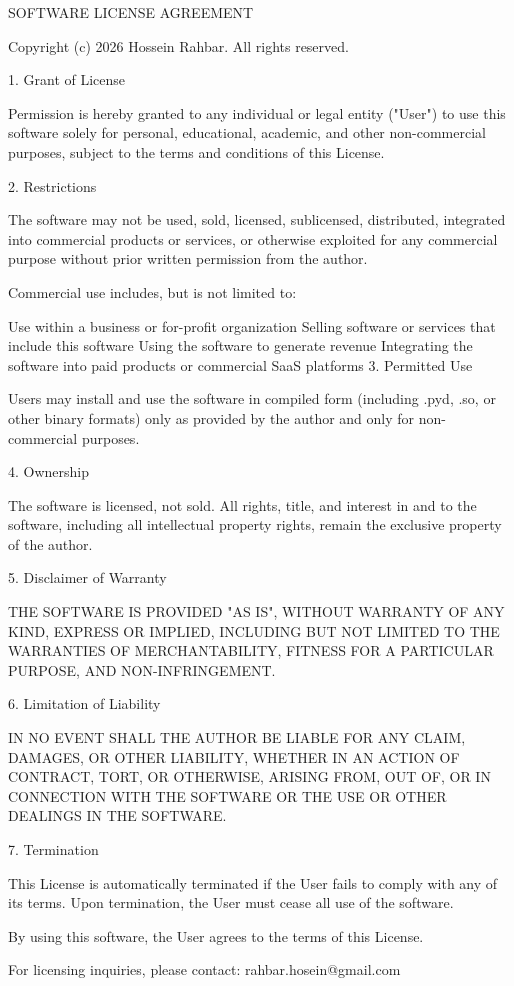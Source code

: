 SOFTWARE LICENSE AGREEMENT

Copyright (c) 2026 Hossein Rahbar. All rights reserved.

1. Grant of License

Permission is hereby granted to any individual or legal entity ("User") to use this software solely for personal, educational, academic, and other non-commercial purposes, subject to the terms and conditions of this License.

2. Restrictions

The software may not be used, sold, licensed, sublicensed, distributed, integrated into commercial products or services, or otherwise exploited for any commercial purpose without prior written permission from the author.

Commercial use includes, but is not limited to:

Use within a business or for-profit organization
Selling software or services that include this software
Using the software to generate revenue
Integrating the software into paid products or commercial SaaS platforms
3. Permitted Use

Users may install and use the software in compiled form (including .pyd, .so, or other binary formats) only as provided by the author and only for non-commercial purposes.

4. Ownership

The software is licensed, not sold. All rights, title, and interest in and to the software, including all intellectual property rights, remain the exclusive property of the author.

5. Disclaimer of Warranty

THE SOFTWARE IS PROVIDED "AS IS", WITHOUT WARRANTY OF ANY KIND, EXPRESS OR IMPLIED, INCLUDING BUT NOT LIMITED TO THE WARRANTIES OF MERCHANTABILITY, FITNESS FOR A PARTICULAR PURPOSE, AND NON-INFRINGEMENT.

6. Limitation of Liability

IN NO EVENT SHALL THE AUTHOR BE LIABLE FOR ANY CLAIM, DAMAGES, OR OTHER LIABILITY, WHETHER IN AN ACTION OF CONTRACT, TORT, OR OTHERWISE, ARISING FROM, OUT OF, OR IN CONNECTION WITH THE SOFTWARE OR THE USE OR OTHER DEALINGS IN THE SOFTWARE.

7. Termination

This License is automatically terminated if the User fails to comply with any of its terms. Upon termination, the User must cease all use of the software.

By using this software, the User agrees to the terms of this License.

For licensing inquiries, please contact: rahbar.hosein@gmail.com
